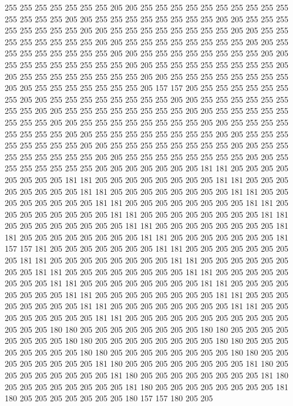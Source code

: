 255 255 255 255 255 255 255 205 205 255 255 255 255 255 255 255 255 255 255 255
255 255 255 205 205 255 255 255 255 255 255 255 255 205 205 255 255 255 255 255
255 255 255 205 205 255 255 255 255 255 255 255 255 205 205 255 255 255 255 255
255 255 255 205 205 255 255 255 255 255 255 255 255 205 205 255 255 255 255 255
255 255 255 205 205 255 255 255 255 255 255 255 255 205 205 255 255 255 255 255
255 255 255 205 205 255 255 255 255 255 255 255 255 205 205 255 255 255 255 255
255 255 255 205 205 255 255 255 255 255 255 255 255 205 205 255 255 255 255 255
255 255 205 157 157 205 255 255 255 255 255 255 255 205 205 255 255 255 255 255
255 255 255 205 205 255 255 255 255 255 255 255 255 205 205 255 255 255 255 255
255 255 255 205 205 255 255 255 255 255 255 255 255 205 205 255 255 255 255 255
255 255 255 205 205 255 255 255 255 255 255 255 255 205 205 255 255 255 255 255
255 255 255 205 205 255 255 255 255 255 255 255 255 205 205 255 255 255 255 255
255 255 255 205 205 255 255 255 255 255 255 255 255 205 205 255 255 255 255 255
255 255 255 205 205 255 255 255 255 255 255 255 205 205 205 205 205 205 205 181
181 205 205 205 205 205 205 205 205 181 181 205 205 205 205 205 205 205 205 181
181 205 205 205 205 205 205 205 205 181 181 205 205 205 205 205 205 205 205 181
181 205 205 205 205 205 205 205 205 181 181 205 205 205 205 205 205 205 205 181
181 205 205 205 205 205 205 205 205 181 181 205 205 205 205 205 205 205 205 181
181 205 205 205 205 205 205 205 205 181 181 205 205 205 205 205 205 205 205 181
181 205 205 205 205 205 205 205 205 181 181 205 205 205 205 205 205 205 181 157
157 181 205 205 205 205 205 205 205 181 181 205 205 205 205 205 205 205 205 181
181 205 205 205 205 205 205 205 205 181 181 205 205 205 205 205 205 205 205 181
181 205 205 205 205 205 205 205 205 181 181 205 205 205 205 205 205 205 205 181
181 205 205 205 205 205 205 205 205 181 181 205 205 205 205 205 205 205 205 181
181 205 205 205 205 205 205 205 205 181 181 205 205 205 205 205 205 205 205 181
181 205 205 205 205 205 205 205 205 181 181 205 205 205 205 205 205 205 205 181
181 205 205 205 205 205 205 205 205 205 205 205 205 205 205 180 180 205 205 205
205 205 205 205 205 180 180 205 205 205 205 205 205 205 205 180 180 205 205 205
205 205 205 205 205 180 180 205 205 205 205 205 205 205 205 180 180 205 205 205
205 205 205 205 205 180 180 205 205 205 205 205 205 205 205 181 180 205 205 205
205 205 205 205 205 181 180 205 205 205 205 205 205 205 205 181 180 205 205 205
205 205 205 205 205 181 180 205 205 205 205 205 205 205 205 181 180 205 205 205
205 205 205 205 205 181 180 205 205 205 205 205 205 205 180 157 157 180 205 205
